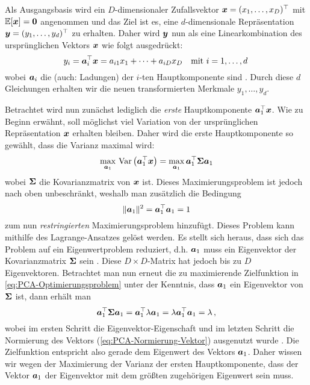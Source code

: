 Als Ausgangsbasis wird ein $D$-dimensionaler Zufallsvektor $\bm{x} = (x_1, \ldots,
		x_D)^\top$ mit $\operatorname{\mathbb{E}}[\bm{x}] = \bm{0}$ angenommen und das Ziel ist es, eine $d$-dimensionale
Repräsentation $\bm{y} = (y_1,\ldots,y_d)^\top$ zu erhalten. Daher wird $\bm{y}$
nun als eine Linearkombination des ursprünglichen Vektors $\bm{x}$ wie folgt ausgedrückt:
\begin{equation}
	y_i = \bm{a}_i^\top \bm{x} = a_{i1} x_1 + \cdots + a_{iD} x_D
	\quad \text{mit } i = 1,\ldots,d \,
\end{equation}
wobei $\bm{a}_i$ die  (auch: Ladungen) der $i$-ten Hauptkomponente sind \parencite[vgl.][2]{Jolliffe.2002}. Durch diese $d$ Gleichungen erhalten wir die neuen transformierten
Merkmale $y_1, \ldots, y_d$.

Betrachtet wird nun zunächst lediglich die \textit{erste} Hauptkomponente $\bm{a}_1^\top
	\bm{x}$. Wie zu Beginn erwähnt, soll möglichst viel Variation von der ursprünglichen
Repräsentation $\bm{x}$ erhalten bleiben. Daher wird die erste Hauptkomponente so gewählt, dass
die Varianz maximal wird:
\begin{equation}
	\label{eq:PCA-Optimierungsproblem}
	\max_{\bm{a}_1}\, \operatorname{Var} \left( \bm{a}_1^\top \bm{x} \right) = \max_{\bm{a}_1} \bm{a}_1^\top \mathbf{\Sigma} \bm{a}_1
\end{equation}
wobei $\mathbf{\Sigma}$ die Kovarianzmatrix von $\bm{x}$ ist. Dieses Maximierungsproblem ist jedoch nach oben unbeschränkt, weshalb man zusätzlich die Bedingung
\begin{equation}
	\label{eq:PCA-Normierung-Vektor}
	\lVert \bm{a}_1 \rVert^2 = \bm{a}_1^\top \bm{a}_1 = 1
\end{equation}
zum nun \textit{restringierten} Maximierungsproblem hinzufügt. Dieses Problem kann mithilfe des Lagrange-Ansatzes gelöst werden. Es stellt sich heraus, dass sich das Problem auf ein Eigenwertproblem reduziert, d.h. $\bm{a}_1$ muss ein Eigenvektor der Kovarianzmatrix $\mathbf{\Sigma}$ sein \parencite[vgl.][4 -- 6]{Jolliffe.2002}. Diese $D \times D$-Matrix hat jedoch bis zu $D$ Eigenvektoren.
Betrachtet man nun erneut die zu maximierende Zielfunktion in \eqref{eq:PCA-Optimierungsproblem}
unter der Kenntnis, dass $\bm{a}_1$ ein Eigenvektor von $\mathbf{\Sigma}$ ist, dann erhält man
\begin{equation}
	\bm{a}_1^\top \mathbf{\Sigma} \bm{a}_1 = \bm{a}_1^\top \lambda \bm{a}_1 = \lambda \bm{a}_1^\top \bm{a}_1 = \lambda \, ,
\end{equation}
wobei im ersten Schritt die Eigenvektor-Eigenschaft und im letzten Schritt die Normierung des Vektors (\eqref{eq:PCA-Normierung-Vektor}) ausgenutzt wurde \parencite[5]{Jolliffe.2002}. Die Zielfunktion entspricht also gerade dem Eigenwert des Vektors
$\bm{a}_1$. Daher wissen wir wegen der Maximierung der Varianz der ersten Hauptkomponente, dass
der Vektor $\bm{a}_1$ der Eigenvektor mit dem größten zugehörigen Eigenwert sein muss.

